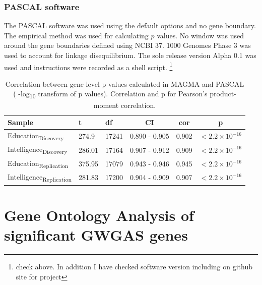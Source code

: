 \subsubsection{PASCAL software}
The PASCAL software was used using the default options and no gene boundary. The empirical method was used for calculating $p$ values. No window was used around the gene boundaries defined using NCBI 37. 1000 Genomes Phase 3 was used to account for linkage disequilibrium. The sole release version  Alpha 0.1 was used and instructions were recorded as a shell script. \footnote{check above. In addition I have checked software version including on github site for project} 


\begin{table}[ht]
    \centering
    \begin{tabular}{lllccc}
    \toprule
    Sample & t & df & CI & cor & p \\
    \midrule
      Education\textsubscript{Discovery}   & 274.9 & 17241 & 0.890 - 0.905 & 0.902 & $<2.2 \times 10^{-16}$  \\
       Intelligence\textsubscript{Discovery} &286.01 & 17164 & 0.907 - 0.912 & 0.909 & $<2.2 \times 10^{-16}$\\
      Education\textsubscript{Replication} & 375.95 & 17079 & 0.943 - 0.946 & 0.945 & $<2.2 \times 10^{-16}$ \\
       
        Intelligence\textsubscript{Replication} &281.83 & 17200 & 0.904 - 0.909 & 0.907 &$<2.2 \times 10^{-16}$ \\
        \bottomrule
        \end{tabular}
    \caption{Correlation between gene level p values calculated in MAGMA and PASCAL ( -log\textsubscript{10} transform of p values). Correlation and p for Pearson's product-moment correlation. }
    \label{tab:correlation MAGMA and PASCAL}
\end{table}
\clearpage



\section{Gene Ontology Analysis of significant GWGAS genes}
\label{sec:Gene Ontology Analysis of significant GWGAS genes}


